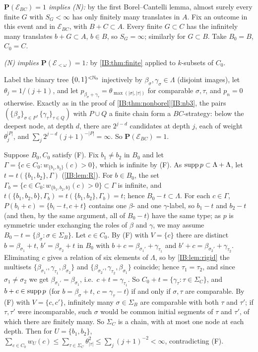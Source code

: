 \emph{$\mathbf P(\mathcal E_{BC})=1$ implies (N):} by the first Borel--Cantelli lemma, almost
surely every finite $G$ with $S_G<\infty$ has only finitely many translates in $A$.
Fix an outcome in this event and in $\mathcal E_{BC}$, with $B+C\subset A$. Every finite
$G\subset C$ has the infinitely many translates $b+G\subset A$, $b\in B$, so $S_G=\infty$; similarly
for $G\subset B$. Take $B_0=B$, $C_0=C$.

\emph{(N) implies $\mathbf P(\mathcal E_{<\omega})=1$:} by \cref{IB:thm:finite} applied to $k$-subsets of
$C_0$.

\begin{example}[$\mathbf P(\mathcal E_{BC})=1$ but (F) fails]
\label{IB:ex:tree}
Label the binary tree $\{0,1\}^{<\mathbb{N}_0}$ injectively by $\beta_\sigma,\gamma_\sigma\in\Lambda$ (disjoint images), let
$\theta_j=1/(j+1)$, and let $p_{\beta_\sigma+\gamma_\tau}=\theta_{\max(|\sigma|,|\tau|)}$ for comparable $\sigma,\tau$, and $p_n=0$
otherwise. Exactly as in the proof of \cref{IB:thm:nonborel}\ref{IB:nb3}, the pairs
$(\{\beta_\sigma\}_{\sigma\in P},\{\gamma_\tau\}_{\tau\in Q})$ with $P\cup Q$ a finite chain form a $BC$-strategy:
below the deepest node, at depth $d$, there are $2^{j-d}$ candidates at depth $j$, each
of weight $\theta_j^{|P|}$, and $\sum_j2^{j-d}(j+1)^{-|P|}=\infty$. So $\mathbf P(\mathcal E_{BC})=1$.

Suppose $B_0,C_0$ satisfy (F). Fix $b_1\ne b_2$ in $B_0$ and let
$\Gamma=\{c\in C_0:w_{\{b_1,b_2\}}(c)>0\}$, which is infinite by (F). As $\operatorname{supp} p\subset\Lambda+\Lambda$, let
$t=t(\{b_1,b_2\},\Gamma)$ (\cref{IB:lem:R}). For $b\in B_0$, the set
$\Gamma_b=\{c\in C_0:w_{\{b_1,b_2,b\}}(c)>0\}\subset\Gamma$ is infinite, and
$t(\{b_1,b_2,b\},\Gamma_b)=t(\{b_1,b_2\},\Gamma_b)=t$; hence $B_0-t\subset\Lambda$. For each $c\in\Gamma$,
$P(b_i+c)=\{b_i-t,c+t\}$ contains one $\beta$- and one $\gamma$-label, so $b_1-t$ and $b_2-t$
(and then, by the same argument, all of $B_0-t$) have the same type; as $p$ is
symmetric under exchanging the roles of $\beta$ and $\gamma$, we may assume
$B_0-t=\{\beta_\sigma:\sigma\in\Sigma_B\}$. Let $c\in C_0$. By (F) with $V=\{c\}$ there are distinct
$b=\beta_{\sigma_1}+t$, $b'=\beta_{\sigma_2}+t$ in $B_0$ with $b+c=\beta_{\sigma_1'}+\gamma_{\tau_1}$ and
$b'+c=\beta_{\sigma_2'}+\gamma_{\tau_2}$. Eliminating $c$ gives a relation of six elements of $\Lambda$,
so by \cref{IB:lem:rigid} the multisets $\{\beta_{\sigma_1'},\gamma_{\tau_1},\beta_{\sigma_2}\}$ and
$\{\beta_{\sigma_2'},\gamma_{\tau_2},\beta_{\sigma_1}\}$ coincide; hence $\tau_1=\tau_2$, and since $\sigma_1\ne\sigma_2$ we
get $\beta_{\sigma_1'}=\beta_{\sigma_1}$, i.e.\ $c+t=\gamma_{\tau_1}$. So $C_0+t=\{\gamma_\tau:\tau\in\Sigma_C\}$, and
$b+c\in\operatorname{supp} p$ (for $b=\beta_\sigma+t$, $c=\gamma_\tau-t$) if and only if $\sigma,\tau$ are comparable.
By (F) with $V=\{c,c'\}$, infinitely many $\sigma\in\Sigma_B$ are comparable with both $\tau$ and
$\tau'$; if $\tau,\tau'$ were incomparable, such $\sigma$ would be common initial segments of
$\tau$ and $\tau'$, of which there are finitely many. So $\Sigma_C$ is a chain, with at most
one node at each depth. Then for $U=\{b_1,b_2\}$,
$\sum_{c\in C_0}w_U(c)\le\sum_{\tau\in\Sigma_C}\theta_{|\tau|}^2\le\sum_j(j+1)^{-2}<\infty$, contradicting (F).
\end{example}

